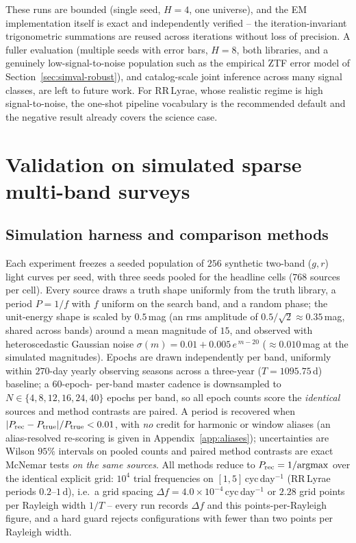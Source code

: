 \documentclass[apj]{emulateapj}
\begin{document}
These runs are bounded (single seed, $H=4$, one universe), and the EM
implementation itself is exact and independently verified -- the
iteration-invariant trigonometric summations are reused across iterations
without loss of precision.  A fuller evaluation (multiple seeds with error
bars, $H=8$, both libraries, and a genuinely low-signal-to-noise population
such as the empirical ZTF error model of Section~\ref{sec:simval-robust}), and
catalog-scale joint inference across many signal classes, are left to future
work.  For RR\,Lyrae, whose realistic regime is high signal-to-noise, the
one-shot pipeline vocabulary is the recommended default and the negative
result already covers the science case.

\section{Validation on simulated sparse multi-band surveys}
\label{sec:simval}

\subsection{Simulation harness and comparison methods}
\label{sec:simval-harness}

Each experiment freezes a seeded population of $256$ synthetic two-band
($g,r$) light curves per seed, with three seeds pooled for the headline
cells ($768$ sources per cell).  Every source draws a truth shape
uniformly from the truth library, a period $P = 1/f$ with $f$ uniform on
the search band, and a random phase; the unit-energy shape is scaled by
$0.5$\,mag (an rms amplitude of $0.5/\sqrt{2} \approx 0.35$\,mag, shared
across bands) around a mean magnitude of $15$, and observed with
heteroscedastic Gaussian noise
$\sigma(m) = 0.01 + 0.005\,e^{\,m-20}$
($\approx 0.010$\,mag at the simulated magnitudes).  Epochs are drawn
independently per band, uniformly within $270$-day yearly observing
seasons across a three-year ($T = 1095.75$\,d) baseline; a $60$-epoch-%
per-band master cadence is downsampled to
$N \in \{4, 8, 12, 16, 24, 40\}$ epochs per band, so all epoch counts
score the \emph{identical} sources and method contrasts are paired.
A period is recovered when $|P_{\rm rec}-P_{\rm true}|/P_{\rm true} <
0.01$, with \emph{no} credit for harmonic or window aliases (an
alias-resolved re-scoring is given in Appendix~\ref{app:aliases});
uncertainties are Wilson $95\%$ intervals on pooled counts and paired
method contrasts are exact McNemar tests \emph{on the same sources}.
All methods reduce to $P_{\rm rec} = 1/{\rm argmax}$ over the identical
explicit grid: $10^4$ trial frequencies on $[1, 5]$\,cyc\,day$^{-1}$
(RR\,Lyrae periods $0.2$--$1$\,d), i.e.\ a grid spacing
$\Delta f = 4.0\times10^{-4}$\,cyc\,day$^{-1}$ or $2.28$ grid points per
Rayleigh width $1/T$ -- every run records $\Delta f$ and this
points-per-Rayleigh figure, and a hard guard rejects configurations with
fewer than two points per Rayleigh width.
\end{document}
